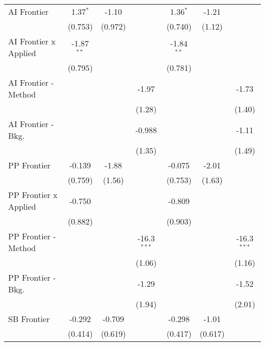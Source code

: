 \begin{tabular}{lcccccc}
   AI Frontier                  & 1.37$^{*}$    & -1.10   &               & 1.36$^{*}$    & -1.21   &   \\   
                                & (0.753)       & (0.972) &               & (0.740)       & (1.12)  &   \\   
   AI Frontier x Applied        & -1.87$^{**}$  &         &               & -1.84$^{**}$  &         &   \\   
                                & (0.795)       &         &               & (0.781)       &         &   \\   
   AI Frontier - Method         &               &         & -1.97         &               &         & -1.73\\   
                                &               &         & (1.28)        &               &         & (1.40)\\   
   AI Frontier - Bkg.           &               &         & -0.988        &               &         & -1.11\\   
                                &               &         & (1.35)        &               &         & (1.49)\\   
   PP Frontier                  & -0.139        & -1.88   &               & -0.075        & -2.01   &   \\   
                                & (0.759)       & (1.56)  &               & (0.753)       & (1.63)  &   \\   
   PP Frontier x Applied        & -0.750        &         &               & -0.809        &         &   \\   
                                & (0.882)       &         &               & (0.903)       &         &   \\   
   PP Frontier - Method         &               &         & -16.3$^{***}$ &               &         & -16.3$^{***}$\\   
                                &               &         & (1.06)        &               &         & (1.16)\\   
   PP Frontier - Bkg.           &               &         & -1.29         &               &         & -1.52\\   
                                &               &         & (1.94)        &               &         & (2.01)\\   
   SB Frontier                  & -0.292        & -0.709  &               & -0.298        & -1.01   &   \\   
                                & (0.414)       & (0.619) &               & (0.417)       & (0.617) &   \\   

\end{tabular}
